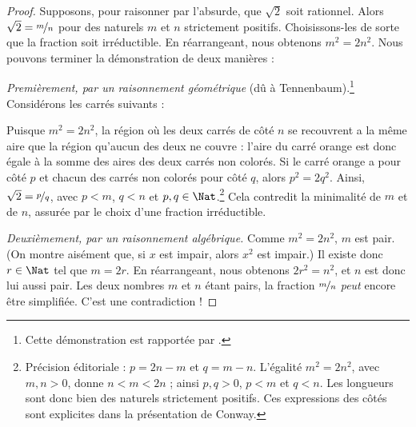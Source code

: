 \documentclass[11pt,a4paper,openany]{memoir}
\begin{document}
\begin{proof}
Supposons, pour raisonner par l'absurde, que $\sqrt{2}$ soit rationnel.
Alors $\sqrt{2} = \nicefrac{m}{n}$ pour des naturels $m$ et $n$
strictement positifs. Choisissons-les de sorte que la fraction soit
irréductible. En réarrangeant, nous obtenons $m^{2} = 2n^{2}$.
Nous pouvons terminer la démonstration de deux manières :

\emph{Premièrement, par un raisonnement géométrique} (dû à Tennenbaum).\footnote{Cette démonstration est rapportée par \cite{Conway2006}.}
Considérons les carrés suivants :
\begin{center}
\end{center}
Puisque $m^2 = 2n^2$, la région où les deux carrés de côté $n$ se
recouvrent a la même aire que la région qu'aucun des deux ne couvre :
l'aire du carré orange est donc égale à la somme des aires des deux
carrés non colorés. Si le carré orange a pour côté $p$ et chacun des
carrés non colorés pour côté $q$, alors $p^2 = 2q^2$. Ainsi,
$\sqrt{2} = \nicefrac{p}{q}$, avec $p < m$, $q < n$ et $p, q \in
\Nat$.\footnote{Précision éditoriale : $p=2n-m$ et $q=m-n$. L'égalité $m^2=2n^2$, avec $m,n>0$, donne $n<m<2n$ ; ainsi $p,q>0$, $p<m$ et $q<n$. Les longueurs sont donc bien des naturels strictement positifs. Ces expressions des côtés sont explicites dans la présentation de Conway.}
Cela contredit la minimalité de $m$ et de $n$, assurée par le choix
d'une fraction irréductible.

\emph{Deuxièmement, par un raisonnement algébrique.} Comme
$m^{2} = 2n^{2}$, $m$ est pair. (On montre aisément que, si $x$ est
impair, alors $x^2$ est impair.) Il existe donc $r \in \Nat$ tel que
$m = 2r$. En réarrangeant, nous obtenons $2r^2 = n^2$,
et $n$ est donc lui aussi pair. Les deux nombres $m$ et $n$ étant
pairs, la fraction $\nicefrac{m}{n}$ \emph{peut} encore être simplifiée.
C'est une contradiction !{}
\end{proof}
\end{document}

